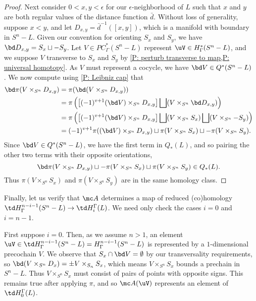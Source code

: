 \begin{example}
\begin{proof}
	Next consider $0 < x, y < \epsilon$ for our $\epsilon$-neighborhood of $L$ such that $x$ and $y$ are both regular values of the distance function $\bar d$.
	Without loss of generality, suppose $x < y$, and let $D_{x,y} = \bar d^{-1}([x,y])$, which is a manifold with boundary in $S^n-L$.
	Given our convention for orienting $S_x$ and $S_y$, we have $\bd D_{x,y} = S_x \sqcup -S_y$.
	Let $V \in PC^*_\Gamma(S^n-L)$ represent $\uV \in H^*_\Gamma(S^n - L)$, and we suppose $V$ transverse to $S_x$ and $S_y$ by \cref{P: perturb transverse to map,P: universal homotopy}.
	As $V$ must represent a cocycle, we have $\bd V \in Q^*(S^n - L)$.
	We now compute using \cref{P: Leibniz cap} that
	\begin{align*}
	\bd \pi(V \times_{S^n} D_{x,y}) &= \pi(\bd (V \times_{S^n} D_{x,y}))\\
	&= \pi\left(\left[(-1)^{v+1} (\bd V) \times_{S^n}D_{x,y} \right] \bigsqcup (V \times_{S^n} \bd D_{x,y})\right)\\
	&= \pi\left(\left[(-1)^{v+1} (\bd V) \times_{S^n}D_{x,y} \right] \bigsqcup (V \times_{S^n} S_x)\bigsqcup (V \times_{S^n} -S_y)\right)\\
	&=(-1)^{v+1} \pi((\bd V) \times_{S^n}D_{x,y}) \sqcup \pi(V \times_{S^n} S_x) \sqcup -\pi(V \times_{S^n} S_y).
	\end{align*}
	Since $\bd V \in Q^*(S^n-L)$, we have the first term in $Q_*(L)$, and so pairing the other two terms with their opposite orientations,
	$$\bd \pi(V \times_{S^n} D_{x,y})\sqcup -\pi(V \times_{S^n} S_x) \sqcup \pi(V \times_{S^n} S_y) \in Q_*(L).$$
	Thus $\pi(V \times_{S^n} S_x)$ and $\pi(V \times_{S^n} S_y)$ are in the same homology class.
\end{proof}

Finally, let us verify that $\mc A$ determines a map of reduced (co)homology $\td H^{n-i-1}_\Gamma(S^n-L) \to \td H_i^\Gamma(L)$.
We need only check the cases $i = 0$ and $i = n-1$.

First suppose $i = 0$.
Then, as we assume $n > 1$, an element $\uV \in \td H^{n-i-1}_\Gamma(S^n-L) = H^{n-i-1}_\Gamma(S^n-L)$ is represented by a $1$-dimensional precochain $V$.
We observe that $S_x \cap \bd V = \emptyset$ by our transversality requirements, so $\bd(V \times_{S^n} D_x) = \pm V \times_{S_n} S_x$, which means $V \times_{S^n} S_x$ bounds a prechain in $S^n-L$.
Thus $V \times_{S^n} S_x$ must consist of pairs of points with opposite signs.
This remains true after applying $\pi$, and so $\mc A(\uV)$ represents an element of $\td H_0^\Gamma(L)$.


\end{example}
